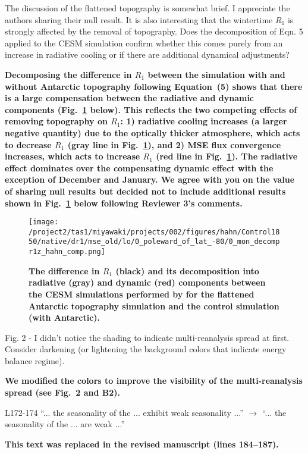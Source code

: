 \documentclass{article}
\begin{document}
The discussion of the flattened topography is somewhat brief. I appreciate the authors sharing their null result. It is also interesting that the wintertime $R_1$ is strongly affected by the removal of topography. Does the decomposition of Eqn. 5 applied to the CESM simulation confirm whether this comes purely from an increase in radiative cooling or if there are additional dynamical adjustments?

\textbf{Decomposing the difference in $R_1$ between the simulation with and without Antarctic topography following Equation~(5) shows that there is a large compensation between the radiative and dynamic components (Fig.~\ref{fig:hahn-decomp} below). This reflects the two competing effects of removing topography on $R_1$: 1) radiative cooling increases (a larger negative quantity) due to the optically thicker atmosphere, which acts to decrease $R_1$ (gray line in Fig.~\ref{fig:hahn-decomp}), and 2) MSE flux convergence increases, which acts to increase $R_1$ (red line in Fig.~\ref{fig:hahn-decomp}). The radiative effect dominates over the compensating dynamic effect with the exception of December and January. We agree with you on the value of sharing null results but decided not to include additional results shown in Fig.~\ref{fig:hahn-decomp} below following Reviewer 3's comments.}

\begin{figure}[!h]
  \noindent\texttt{[image: /project2/tas1/miyawaki/projects/002/figures/hahn/Control1850/native/dr1/mse\_old/lo/0\_poleward\_of\_lat\_-80/0\_mon\_decompr1z\_hahn\_comp.png]}
  \caption{\bf The difference in $R_1$ (black) and its decomposition into radiative (gray) and dynamic (red) components between the CESM simulations performed by \citep{hahn2020} for the flattened Antarctic topography simulation and the control simulation (with Antarctic).}
  \label{fig:hahn-decomp}
\end{figure}

Fig. 2 - I didn't notice the shading to indicate multi-reanalysis spread at first. Consider darkening (or lightening the background colors that indicate energy balance regime).

\textbf{We modified the colors to improve the visibility of the multi-reanalysis spread (see Fig.~2 and B2).}

L172-174 ``... the seasonality of the ... exhibit weak seasonality ...'' $\rightarrow$ ``... the seasonality of the ... are weak ...''

\textbf{This text was replaced in the revised manuscript (lines 184--187).}
\end{document}
